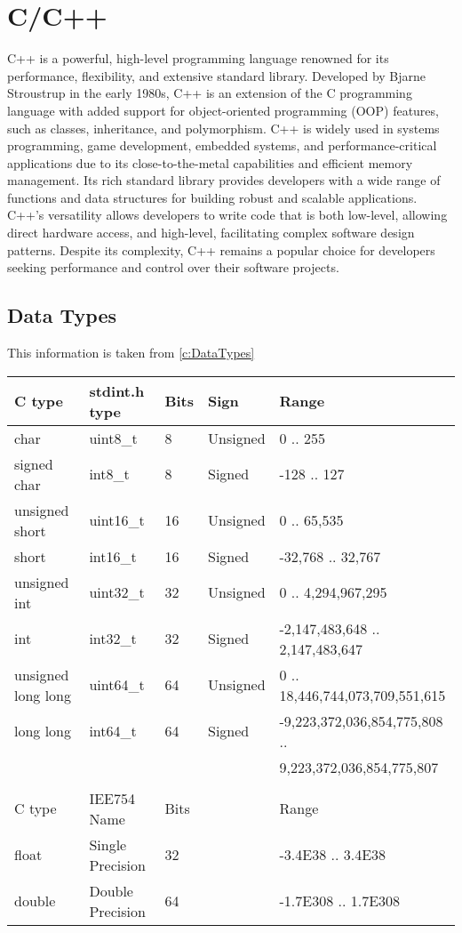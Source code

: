 \chapter{C/C++}
\thispagestyle{fancy}
\lstset{language=C++, style=cppstyle}

C++ is a powerful, high-level programming language renowned for its performance, flexibility, and extensive standard library. Developed by Bjarne Stroustrup in the early 1980s, C++ is an extension of the C programming language with added support for object-oriented programming (OOP) features, such as classes, inheritance, and polymorphism. C++ is widely used in systems programming, game development, embedded systems, and performance-critical applications due to its close-to-the-metal capabilities and efficient memory management. Its rich standard library provides developers with a wide range of functions and data structures for building robust and scalable applications. C++'s versatility allows developers to write code that is both low-level, allowing direct hardware access, and high-level, facilitating complex software design patterns. Despite its complexity, C++ remains a popular choice for developers seeking performance and control over their software projects.

\section{Data Types}

\begin{fancybox}{}	
	This information is taken from \ref{c:DataTypes}
	\begin{center}
		\begin{tabular}{l|l|l|l|l}
			C type & stdint.h type & Bits & Sign & Range\\
			\hline
			char & uint8\_t & 8 & Unsigned & 0 .. 255 \\
			signed char & int8\_t & 8 & Signed & -128 .. 127 \\
			unsigned short & uint16\_t & 16 & Unsigned & 0 .. 65,535 \\
			short & int16\_t & 16 & Signed & -32,768 .. 32,767 \\
			unsigned int & uint32\_t & 32 & Unsigned & 0 .. 4,294,967,295 \\
			int & int32\_t & 32 & Signed & -2,147,483,648 .. 2,147,483,647 \\
			unsigned long long & uint64\_t & 64 & Unsigned & 0 .. 18,446,744,073,709,551,615 \\
			long long & int64\_t & 64 & Signed & -9,223,372,036,854,775,808 .. \\ & & & & \hspace{2em} 9,223,372,036,854,775,807 \\
			& & & & \\
			C type & IEE754 Name & Bits & & Range \\
			\hline
			float & Single Precision & 32 & & -3.4E38 .. 3.4E38 \\
			double & Double Precision & 64 & & -1.7E308 .. 1.7E308
		\end{tabular}
	\end{center}
\end{fancybox}




